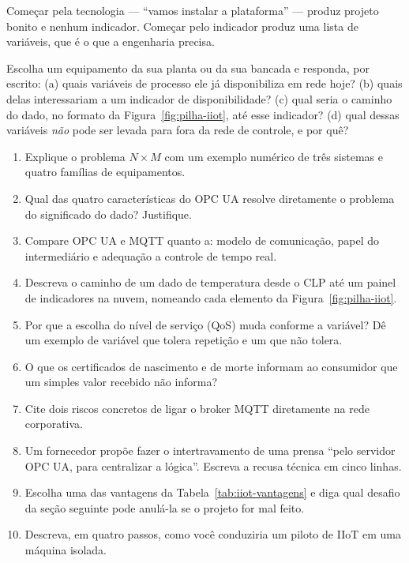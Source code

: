 Começar pela tecnologia --- ``vamos instalar a plataforma'' --- produz projeto bonito e nenhum
indicador. Começar pelo indicador produz uma lista de variáveis, que é o que a engenharia precisa.

\begin{pratica}
Escolha um equipamento da sua planta ou da sua bancada e responda, por escrito:
(a) quais variáveis de processo ele já disponibiliza em rede hoje?
(b) quais delas interessariam a um indicador de disponibilidade?
(c) qual seria o caminho do dado, no formato da Figura~\ref{fig:pilha-iiot}, até esse indicador?
(d) qual dessas variáveis \emph{não} pode ser levada para fora da rede de controle, e por quê?
\end{pratica}

\begin{exercicios}
\begin{enumerate}[label=\alph*)]
  \item Explique o problema $N \times M$ com um exemplo numérico de três sistemas e quatro famílias
        de equipamentos.
  \item Qual das quatro características do OPC UA resolve diretamente o problema do significado do
        dado? Justifique.
  \item Compare OPC UA e MQTT quanto a: modelo de comunicação, papel do intermediário e adequação a
        controle de tempo real.
  \item Descreva o caminho de um dado de temperatura desde o CLP até um painel de indicadores na
        nuvem, nomeando cada elemento da Figura~\ref{fig:pilha-iiot}.
  \item Por que a escolha do nível de serviço (QoS) muda conforme a variável? Dê um exemplo de
        variável que tolera repetição e um que não tolera.
  \item O que os certificados de nascimento e de morte informam ao consumidor que um simples valor
        recebido não informa?
  \item Cite dois riscos concretos de ligar o broker MQTT diretamente na rede corporativa.
  \item Um fornecedor propõe fazer o intertravamento de uma prensa ``pelo servidor OPC UA, para
        centralizar a lógica''. Escreva a recusa técnica em cinco linhas.
  \item Escolha uma das vantagens da Tabela~\ref{tab:iiot-vantagens} e diga qual desafio da seção
        seguinte pode anulá-la se o projeto for mal feito.
  \item Descreva, em quatro passos, como você conduziria um piloto de IIoT em uma máquina isolada.
\end{enumerate}
\end{exercicios}
